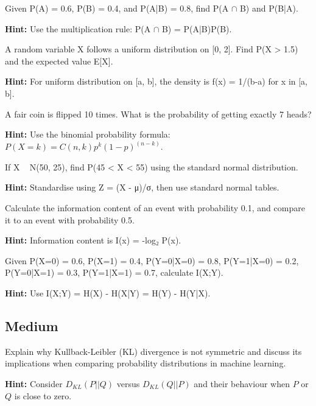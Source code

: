 \begin{problem}
Given P(A) = 0.6, P(B) = 0.4, and P(A|B) = 0.8, find P(A $\cap$ B) and P(B|A).

\textbf{Hint:} Use the multiplication rule: P(A $\cap$ B) = P(A|B)P(B).
\end{problem}

\begin{problem}
A random variable X follows a uniform distribution on [0, 2]. Find P(X > 1.5) and the expected value E[X].

\textbf{Hint:} For uniform distribution on [a, b], the density is f(x) = 1/(b-a) for x in [a, b].
\end{problem}

\begin{problem}
A fair coin is flipped 10 times. What is the probability of getting exactly 7 heads?

\textbf{Hint:} Use the binomial probability formula: $P(X = k) = C(n,k) p^k (1-p)^{(n-k)}$.
\end{problem}

\begin{problem}
If X ~ N(50, 25), find P(45 < X < 55) using the standard normal distribution.

\textbf{Hint:} Standardise using Z = (X - μ)/σ, then use standard normal tables.
\end{problem}

\begin{problem}
Calculate the information content of an event with probability 0.1, and compare it to an event with probability 0.5.

\textbf{Hint:} Information content is I(x) = -log₂ P(x).
\end{problem}

\begin{problem}
Given P(X=0) = 0.6, P(X=1) = 0.4, P(Y=0|X=0) = 0.8, P(Y=1|X=0) = 0.2, P(Y=0|X=1) = 0.3, P(Y=1|X=1) = 0.7, calculate I(X;Y).

\textbf{Hint:} Use I(X;Y) = H(X) - H(X|Y) = H(Y) - H(Y|X).
\end{problem}

\subsection*{Medium}

\begin{problem}
Explain why Kullback-Leibler (KL) divergence is not symmetric and discuss its implications when comparing probability distributions in machine learning.

\textbf{Hint:} Consider $D_{KL}(P||Q)$ versus $D_{KL}(Q||P)$ and their behaviour when $P$ or $Q$ is close to zero.
\end{problem}

